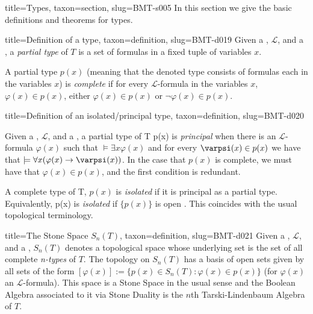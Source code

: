 \documentclass[a4paper]{article}
\begin{document}
\begin{tree}{title={Types}, taxon={section}, slug={BMT-s005}}
In this section we give the basic definitions and theorems for types.
\begin{tree}{title={Definition of a type}, taxon={definition}, slug={BMT-d019}}
Given a , \(\mathcal {L}\), and a , a \emph{partial type} of \(T\) is a  set of formulas in a fixed tuple of variables \(x\).\par{A partial type \(p(x)\) (meaning that the denoted type consists of formulas each in the variables \(x\)) is \emph{complete} if for every \(\mathcal {L}\)-formula in the variables \(x\), \(\varphi (x) \in  p(x)\), either \(\varphi (x) \in  p(x)\) or \(\neg   \varphi (x) \in  p(x)\).}
\end{tree}

\begin{tree}{title={Definition of an isolated/principal type}, taxon={definition}, slug={BMT-d020}}

    Given a , \(\mathcal {L}\), and a ,
    a partial type of T {p(x)} is \emph{principal} when there is an \(\mathcal {L}\)-formula \(\varphi (x)\) such that
    \(\models   \exists  x  \varphi (x)\) and for every \(\varpsi (x)  \in  p(x)\) we have that
    \(\models   \forall  x ( \varphi (x)  \rightarrow   \varpsi (x))\).
    In the case that \(p(x)\) is complete, we must have that \(\varphi (x) \in  p(x)\),
    and the first condition is redundant.
\par{
    A complete type of T, \(p(x)\) is \emph{isolated} if it is principal as a partial type.
    Equivalently, {p(x)} is \emph{isolated} if \(\{ p(x) \}\) is open .
    This coincides with the usual topological terminology.
}
\end{tree}

\begin{tree}{title={The Stone Space \(S_n(T)\)}, taxon={definition}, slug={BMT-d021}}
Given a , \(\mathcal {L}\), and a ,
\(S_n(T)\) denotes a topological space whose underlying set is the set of all complete \emph{n-types} of \(T\).
The topology on \(S_n(T)\) has a basis of open sets given by all sets of the form \([ \varphi (x)] :=  \{ p(x) \in  S_n(T):
 \varphi (x)  \in  p(x) \}\) (for \(\varphi (x)\) an \(\mathcal {L}\)-formula).
This space is a Stone Space in the usual sense and the Boolean Algebra associated to it via Stone Duality is
the \(n\)th Tarski-Lindenbaum Algebra of \(T\).
\end{tree}


\end{tree}
\end{document}
